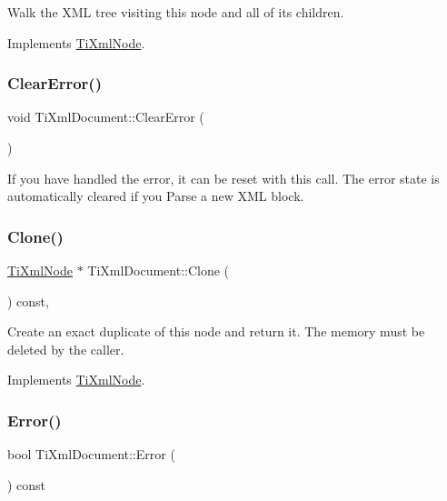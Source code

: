 Walk the X\+ML tree visiting this node and all of its children. 

Implements \hyperlink{class_ti_xml_node_acc0f88b7462c6cb73809d410a4f5bb86}{Ti\+Xml\+Node}.

\hypertarget{class_ti_xml_document_ac66b8c28db86363315712a3574e87c35}{}\label{class_ti_xml_document_ac66b8c28db86363315712a3574e87c35} 
\subsubsection{\texorpdfstring{Clear\+Error()}{ClearError()}}
{\footnotesize\ttfamily void Ti\+Xml\+Document\+::\+Clear\+Error (\begin{DoxyParamCaption}{ }\end{DoxyParamCaption})\hspace{0.3cm}{\ttfamily [inline]}}

If you have handled the error, it can be reset with this call. The error state is automatically cleared if you Parse a new X\+ML block. \hypertarget{class_ti_xml_document_a46a4dda6c56eb106d46d4046ae1e5353}{}\label{class_ti_xml_document_a46a4dda6c56eb106d46d4046ae1e5353} 
\subsubsection{\texorpdfstring{Clone()}{Clone()}}
{\footnotesize\ttfamily \hyperlink{class_ti_xml_node}{Ti\+Xml\+Node} $\ast$ Ti\+Xml\+Document\+::\+Clone (\begin{DoxyParamCaption}{ }\end{DoxyParamCaption}) const\hspace{0.3cm}{\ttfamily [protected]}, {\ttfamily [virtual]}}

Create an exact duplicate of this node and return it. The memory must be deleted by the caller. 

Implements \hyperlink{class_ti_xml_node_a4508cc3a2d7a98e96a54cc09c37a78a4}{Ti\+Xml\+Node}.

\hypertarget{class_ti_xml_document_a348e68faad4a3498f413c51ee9bc321a}{}\label{class_ti_xml_document_a348e68faad4a3498f413c51ee9bc321a} 
\subsubsection{\texorpdfstring{Error()}{Error()}}
{\footnotesize\ttfamily bool Ti\+Xml\+Document\+::\+Error (\begin{DoxyParamCaption}{ }\end{DoxyParamCaption}) const\hspace{0.3cm}{\ttfamily [inline]}}

